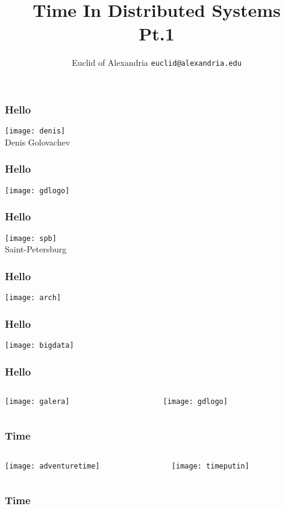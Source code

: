 \documentclass[aspectratio=169]{beamer}
\title{Time In Distributed Systems\\ Pt.1}
\author[Euclid]{Euclid of Alexandria \texttt{euclid@alexandria.edu}}
\begin{document}
{   
	\begin{titlePage} 
		\titlepage        
	\end{titlePage}
	
	\begin{gdblank}
		\frametitle{Hello}
		\centering\texttt{[image: denis]}
		\\Denis Golovachev
	\end{gdblank}
	\begin{gdblank}
		\frametitle{Hello}
		\centering\texttt{[image: gdlogo]}
	\end{gdblank}
	\begin{gdblank}
		\frametitle{Hello}
		\centering\texttt{[image: spb]}
		\\Saint-Petersburg
	\end{gdblank}
	\begin{gdblank}
		\frametitle{Hello}
		\centering\texttt{[image: arch]} 
	\end{gdblank}
	\begin{gdblank}
		\frametitle{Hello}
		\centering\texttt{[image: bigdata]} 
	\end{gdblank}
	\begin{gdblank}
		\frametitle{Hello}
		\begin{columns}
			\begin{column}{0.5\textwidth}
				\centering\texttt{[image: galera]}
			\end{column}
			\pause 
			\begin{column}{0.5\textwidth}
				\centering\texttt{[image: gdlogo]}
			\end{column}
		\end{columns}        
	\end{gdblank}
	\begin{gdblank}
		\frametitle{Time}
		\begin{columns}
			\begin{column}{0.5\textwidth}
				\centering\texttt{[image: adventuretime]} 
			\end{column}
			\pause 
			\begin{column}{0.5\textwidth}
				\centering\texttt{[image: timeputin]} 
			\end{column}
		\end{columns}            
	\end{gdblank}
	\begin{gdblank}
		\frametitle{Time}
		\begin{columns}

\end{columns}
\end{gdblank}}
\end{document}
